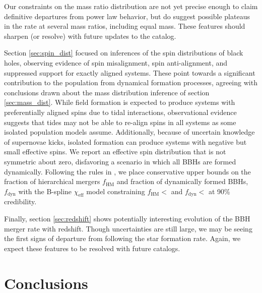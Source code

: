 Our constraints on the mass ratio distribution are not yet precise enough to claim definitive departures from power law behavior, but do suggest possible plateaus in the rate at several mass ratios, including equal mass.  These features should sharpen (or resolve) with future updates to the catalog.

Section \ref{sec:spin_dist} focused on inferences of the spin distributions of black holes, observing evidence of spin misalignment, spin anti-alignment, and suppressed support 
for exactly aligned systems. These point towards a significant contribution to the population from dynamical formation processes, agreeing with 
conclusions drawn about the mass distribution inference of section \ref{sec:mass_dist}. While field formation is expected to produce systems with preferentially 
aligned spins due to tidal interactions, observational evidence suggests that tides may not be able to re-align spins in all systems as some 
isolated population models assume. Additionally, because of uncertain knowledge of supernovae kicks, isolated formation can produce systems with negative but small effective spins. 
We report an effective spin distribution that is not symmetric about zero, disfavoring a scenario in which all BBHs are formed dynamically. Following the rules in \citet{Fishbach_2022}, 
we place conservative upper bounds on the fraction of hierarchical mergers $f_\mathrm{HM}$ and fraction of dynamically formed BBHs, $f_\mathrm{dyn}$ with 
the B-spline $\chi_\mathrm{eff}$ model constraining $f_\mathrm{HM} < $\result{$\macros[ChiEffective][iid][frac_hm][10th percentile]$} 
and $f_\mathrm{dyn} < $ at 90\% credibility. 

Finally, section \ref{sec:redshift} shows potentially interesting evolution of the BBH merger rate with redshift.  Though uncertainties are still large, we may be seeing the first signs of departure from following the star formation rate.  Again, we expect these features to be resolved with future catalogs.

\section{Conclusions}\label{sec:conclusion}

